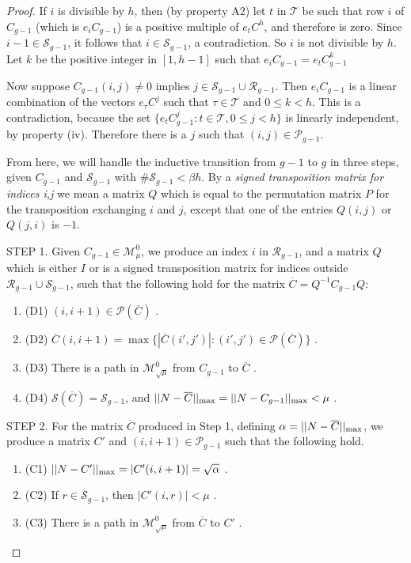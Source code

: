 \documentclass{amsart}
\theoremstyle{definition}
\theoremstyle{remark}
\numberwithin{equation}{section}
\begin{document}
{{\begin{proof}
If $i$ is divisible by $h$, then 
(by property A2) let $t$ in 
$\mathcal T$ be such that row $i$ of $C_{g-1}$ 
(which is $e_iC_{g-1}$) is a positive 
multiple of $e_tC^h$, and therefore is zero. 
Since $i-1\in \mathcal S_{g-1}$, it follows 
that $i\in \mathcal S_{g-1}$, a contradiction. 
So $i$ is not divisible by $h$. Let $k$ be 
the positive integer  in $[1,h-1]$ 
such that $e_iC_{g-1} = e_tC_{g-1}^k $ 

Now suppose  $C_{g-1}(i,j)\neq 0$ implies 
$j\in \mathcal S_{g-1} \cup 
\mathcal R_{g-1}$. 
Then $e_iC_{g-1}$ is 
a linear combination of the vectors 
$e_{\tau}C^j$ such that $\tau\in \mathcal T$ 
and $0\leq k< h$. This is a contradiction, 
because the set 
 $\{e_tC_{g-1}^j: t\in \mathcal T, 0\leq j < h\}$ 
is linearly independent, by property (iv).
 Therefore there is a $j$ 
such that $(i,j)\in \mathcal P_{g-1}$. 

From here, we will handle the inductive transition from $g-1$ to $g$
in three steps,  given $C_{g-1}$ and $\mathcal S_{g-1}$ with 
$\#\mathcal S_{g-1} < \beta h$.  By a {\it signed transposition 
matrix for indices i,j } we mean a matrix $Q$ which is equal 
to the permutation matrix $P$ for the transposition 
exchanging 
$i$ and $j$, except that one of the entries 
$Q(i,j)$ or $Q(j,i)$ is $-1$. 

STEP 1. 
Given $C_{g-1}\in \mathcal M^0_{\mu}$, 
we produce 
 an index $i$ in $\mathcal R_{g-1}$, and a matrix $Q$ 
which is either $I$ or is 
 a signed transposition matrix 
for indices outside $\mathcal R_{g-1}  \cup \mathcal S_{g-1}$, 
 such that  the following hold
for the matrix $\overline C= Q^{-1}C_{g-1}Q$: 
\begin{enumerate} 
\item[] (D1)
$(i,i+1)\in \mathcal P(\overline C)$ .  
\item[] (D2)
$\overline C(i,i+1)= \max \{|\overline C(i',j')|: (i',j')
\in \mathcal P(\overline C)\}$   . 
\item[] (D3) 
There is  a path in  
$\mathcal M^0_{\sqrt{\mu}}$ from
$C_{g-1}$ to $\overline C$ .
\item[] (D4) 
$\mathcal S(\overline C) = \mathcal S_{g-1}$, and 
$||N-\overline C||_{\textnormal{max}}= 
||N-C_{g-1}||_{\textnormal{max}} < \mu $ .  
\end{enumerate} 

STEP 2. 
For the matrix $\overline C$ produced in Step 1, 
defining $ \alpha=||N-\overline C||_{\textnormal{max}}$,  
we produce a matrix $C'$ and $(i,i+1)\in \mathcal P_{g-1}$ 
 such that the following 
hold. 
\begin{enumerate} 
\item[] (C1) 
$||N-C'||_{\textnormal{max}}= |C'(i,i+1)| =
\sqrt{\alpha } $ .
\item[] (C2)
If $r\in \mathcal S_{g-1}$, then $|C'(i,r)|<\mu$ . 
\item[] (C3) 
There is a path in $\mathcal M^0_{\sqrt{\mu}}$ from $\overline C$ to $C'$ . 
\end{enumerate} 


\end{proof}}}
\end{document}
